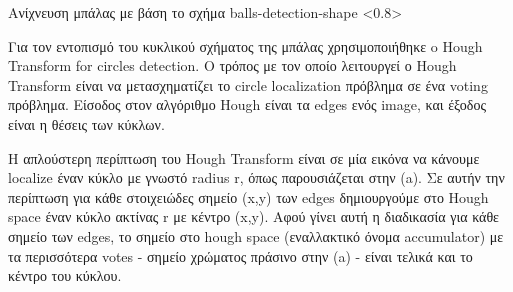 %
{Ανίχνευση μπάλας με βάση το σχήμα}%
{balls-detection-shape}%
<0.8>

Για τον εντοπισμό του κυκλικού σχήματος της μπάλας χρησιμοποιήθηκε o Hough Transform for circles detection.
Ο τρόπος με τον οποίο λειτουργεί ο Hough Transform είναι να μετασχηματίζει το circle localization πρόβλημα σε ένα voting πρόβλημα.
Είσοδος στον αλγόριθμο Hough είναι τα edges ενός image, και έξοδος είναι η θέσεις των κύκλων.

Η απλούστερη περίπτωση του Hough Transform είναι σε μία εικόνα να κάνουμε localize έναν κύκλο με γνωστό radius r, όπως παρουσιάζεται στην  (a). Σε αυτήν την περίπτωση για κάθε στοιχειώδες σημείο (x,y) των edges δημιουργούμε στο Hough space έναν κύκλο ακτίνας r με κέντρο (x,y). Αφού γίνει αυτή η διαδικασία για κάθε σημείο των edges, το σημείο στο hough space (εναλλακτικό όνομα accumulator) με τα περισσότερα votes - σημείο χρώματος πράσινο στην  (a) - είναι τελικά και το κέντρο του κύκλου.

